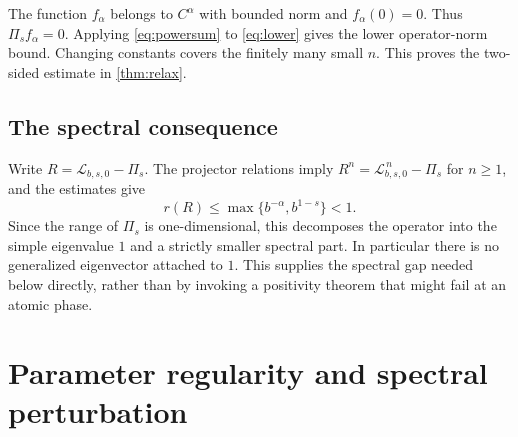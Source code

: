 \documentclass[11pt,a4paper]{article}
\numberwithin{equation}{section}
\theoremstyle{definition}
\theoremstyle{remark}
\newcommand{\Lop}{\mathcal L}
\newcommand{\Proj}{\Pi}
\begin{document}
The function $f_\alpha$ belongs to $C^\alpha$ with bounded norm and
$f_\alpha(0)=0$. Thus $\Proj_sf_\alpha=0$. Applying
\cref{eq:powersum} to \cref{eq:lower} gives the lower operator-norm bound.
Changing constants covers the finitely many small $n$.
This proves the two-sided estimate in \cref{thm:relax}.

\subsection{The spectral consequence}
Write $R=\Lop_{b,s,0}-\Proj_s$. The projector relations imply
$R^n=\Lop_{b,s,0}^{\,n}-\Proj_s$ for $n\ge1$, and the estimates give
\[
 r(R)\le\max\{b^{-\alpha},b^{1-s}\}<1.
\]
Since the range of $\Proj_s$ is one-dimensional, this decomposes the
operator into the simple eigenvalue $1$ and a strictly smaller spectral
part. In particular there is no generalized eigenvector attached to $1$.
This supplies the spectral gap needed below directly, rather than by
invoking a positivity theorem that might fail at an atomic phase.

\section{Parameter regularity and spectral perturbation}
\label{sec:perturb}
\end{document}
